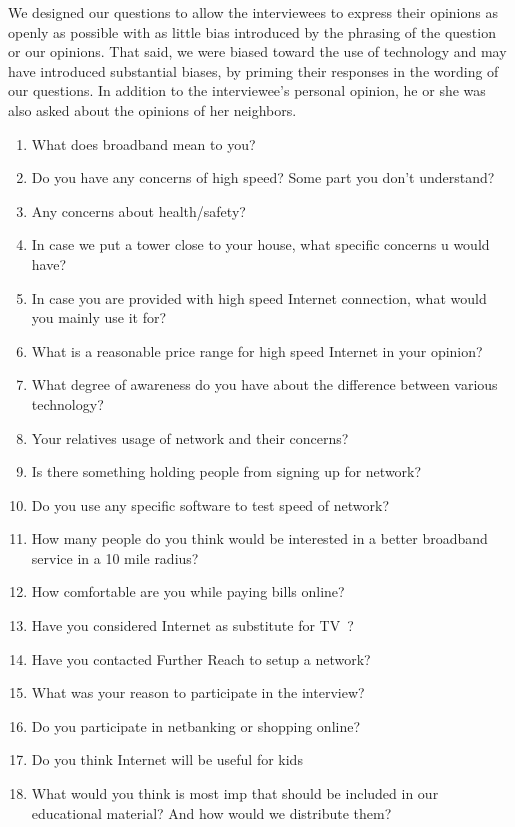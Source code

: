 We designed our questions to allow the interviewees to express their opinions as openly as possible with as little bias introduced by the
phrasing of the question or our opinions. That said, we
were biased toward the use of technology and may have introduced substantial
biases, by priming their responses in the wording of our questions. In addition
to the interviewee's personal opinion, he or she was also asked about the opinions of her
neighbors.

\begin{table}
\begin{enumerate}
    \item What does broadband mean to you?
    \item Do you have any concerns of high speed? Some part you don’t understand?
    \item Any concerns about health/safety?
    \item In case we put a tower close to your house, what specific concerns u would have?
    \item In case you are provided with high speed Internet connection, what would you mainly use it for?
    \item What is a reasonable price range for high speed Internet in your opinion?
    \item What degree of awareness do you have about the difference between various technology?
    \item Your relatives usage of network and their concerns?
    \item Is there something holding people from signing up for network?
    \item Do you use any specific software to test speed of network?
    \item How many people do you think would be interested in a better broadband service in a 10 mile radius?
    \item How comfortable are you while paying bills online?
    \item Have you considered Internet as substitute for TV~?
    \item Have you contacted Further Reach to setup a network?
    \item What was your reason to participate in the interview?
    \item Do you participate in netbanking or shopping online?
    \item Do you think Internet will be useful for kids
    \item What would you think is most imp that should be included in our educational material? And how would we distribute them?

\end{enumerate}
\end{table}
